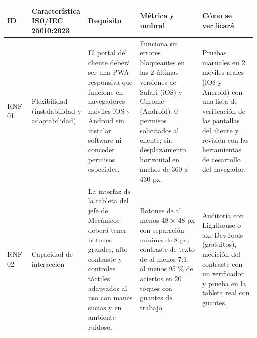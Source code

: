 {\def\LTcaptype{none} %
\begin{longtable}[]{@{}
  >{\raggedright\arraybackslash}p{}
  >{\raggedright\arraybackslash}p{}
  >{\raggedright\arraybackslash}p{}
  >{\raggedright\arraybackslash}p{}
  >{\raggedright\arraybackslash}p{}@{}}
\toprule\noalign{}
\begin{minipage}[b]{\linewidth}\raggedright
\textbf{ID}
\end{minipage} & \begin{minipage}[b]{\linewidth}\raggedright
\textbf{Característica ISO/IEC 25010:2023}
\end{minipage} & \begin{minipage}[b]{\linewidth}\raggedright
\textbf{Requisito}
\end{minipage} & \begin{minipage}[b]{\linewidth}\raggedright
\textbf{Métrica y umbral}
\end{minipage} & \begin{minipage}[b]{\linewidth}\raggedright
\textbf{Cómo se verificará}
\end{minipage} \\
\midrule\noalign{}
\endhead
\bottomrule\noalign{}
\endlastfoot
RNF-01 & Flexibilidad (instalabilidad y adaptabilidad) & El portal del
cliente deberá ser una PWA responsiva que funcione en navegadores
móviles iOS y Android sin instalar software ni conceder permisos
especiales. & Funciona sin errores bloqueantes en las 2 últimas
versiones de Safari (iOS) y Chrome (Android); 0 permisos solicitados al
cliente; sin desplazamiento horizontal en anchos de 360 a 430 px. &
Pruebas manuales en 2 móviles reales (iOS y Android) con una lista de
verificación de las pantallas del cliente y revisión con las
herramientas de desarrollo del navegador. \\
RNF-02 & Capacidad de interacción & La interfaz de la tableta del jefe
de Mecánicos deberá tener botones grandes, alto contraste y controles
táctiles adaptados al uso con manos sucias y en ambiente ruidoso. &
Botones de al menos 48 × 48 px con separación mínima de 8 px; contraste
de texto de al menos 7:1; al menos 95 \% de aciertos en 20 toques con
guantes de trabajo. & Auditoría con Lighthouse o axe DevTools
(gratuitos), medición del contraste con un verificador y prueba en la
tableta real con guantes. \\

\end{longtable}}
